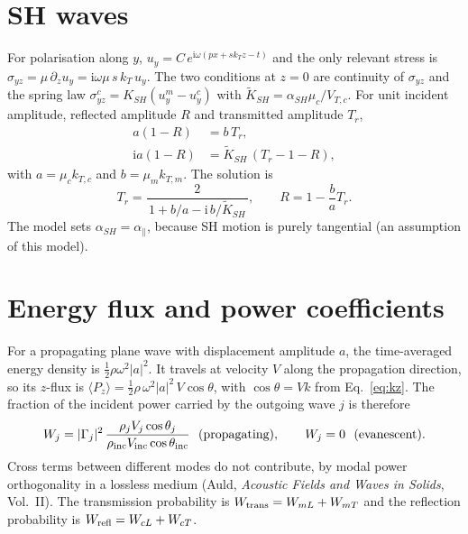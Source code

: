 \documentclass[11pt,a4paper]{article}
\newcommand{\ii}{\mathrm{i}}
\begin{document}
\section{SH waves}
\label{app:SH}

For polarisation along $y$, $u_y=C\,e^{\ii\omega(px+s k_Tz-t)}$ and the only relevant stress is
$\sigma_{yz}=\mu\,\partial_zu_y=\ii\omega\mu\,s\,k_T\,u_y$. The two conditions at $z=0$ are
continuity of $\sigma_{yz}$ and the spring law
$\sigma^{c}_{yz}=K_{SH}(u^m_y-u^c_y)$ with $\tilde K_{SH}=\alpha_{SH}\mu_c/V_{T,c}$. For unit
incident amplitude, reflected amplitude $R$ and transmitted amplitude $T_r$,
\begin{align}
  a(1-R)&=b\,T_r,\\
  \ii a(1-R)&=\tilde K_{SH}\,(T_r-1-R),
\end{align}
with $a=\mu_ck_{T,c}$ and $b=\mu_mk_{T,m}$. The solution is
\begin{equation}
  T_r=\frac{2}{\,1+b/a-\ii\,b/\tilde K_{SH}\,},\qquad R=1-\frac{b}{a}T_r .
  \label{eq:SHclosed}
\end{equation}
The model sets $\alpha_{SH}=\alpha_\parallel$, because SH motion is purely tangential
(an assumption of this model).

\section{Energy flux and power coefficients}

For a propagating plane wave with displacement amplitude $a$, the time-averaged energy
density is $\tfrac12\rho\omega^2|a|^2$. It travels at velocity $V$ along the propagation
direction, so its $z$-flux is $\langle P_z\rangle=\tfrac12\rho\,\omega^2|a|^2\,V\cos\theta$,
with $\cos\theta=Vk$ from Eq.~\eqref{eq:kz}. The fraction of the incident power carried by
the outgoing wave $j$ is therefore
\begin{equation}
  W_j=|\Gamma_j|^2\,\frac{\rho_jV_j\cos\theta_j}{\rho_{\rm inc}V_{\rm inc}\cos\theta_{\rm inc}}
  \ \ \text{(propagating)},\qquad W_j=0\ \ \text{(evanescent)}.
  \label{eq:W}
\end{equation}
Cross terms between different modes do not contribute, by modal power orthogonality in a
lossless medium (Auld, \emph{Acoustic Fields and Waves in Solids}, Vol.~II). The transmission
probability is $W_{\rm trans}=W_{mL}+W_{mT}$ and the reflection probability is
$W_{\rm refl}=W_{cL}+W_{cT}$.
\end{document}
